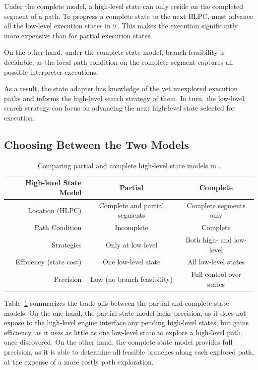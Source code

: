Under the complete model, a high-level state can only reside on the completed segment of a path.
%
To progress a complete state to the next HLPC, \chef must advance all the low-level execution states in it.  This makes the execution significantly more expensive than for partial execution states.

On the other hand, under the complete state model, branch feasibility is decidable, as the local path condition on the complete segment captures all possible interpreter executions.

As a result, the state adapter has knowledge of the yet unexplored execution paths and informs the high-level search strategy of them.
%
In turn, the low-level search strategy can focus on advancing the next high-level state selected for execution.

\subsection{Choosing Between the Two Models}

\newcommand{\goodcolor}{\cellcolor{LimeGreen}}
\newcommand{\badcolor}{\cellcolor{Lavender}}

\begin{table}
  \centering
  \small
  \begin{tabular}{r c c}
    High-level State Model & \textbf{Partial} & \textbf{Complete}               \\
    \hline
    \noalign{\smallskip}
    Location (HLPC) & Complete and partial segments & Complete segments only    \\
    Path Condition  & Incomplete                    & Complete                  \\
    Strategies      & Only at low level             & Both high- and low-level  \\
    \noalign{\smallskip}
    \hline
    \noalign{\smallskip}
    Efficiency (state cost) & \goodcolor One low-level state   & \badcolor All low-level states      \\
    Precision       & \badcolor Low (no branch feasibility)   & \goodcolor Full control over states  \\
  \end{tabular}
  \caption{Comparing partial and complete high-level state models in \chef.}
  \label{tab:chef:hl-states}
\end{table}

Table~\ref{tab:chef:hl-states} summarizes the trade-offs between the partial and complete state models.
%
On the one hand, the partial state model lacks precision, as it does not expose to the high-level engine interface any pending high-level states, but gains efficiency, as it uses as little as one low-level state to explore a high-level path, once discovered.
%
On the other hand, the complete state model provides full precision, as it is able to determine all feasible branches along each explored path, at the expense of a more costly path exploration.

